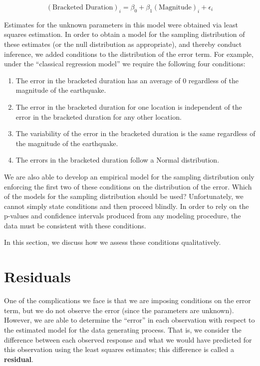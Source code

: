 \documentclass[]{book}
\providecommand{\tightlist}{%
  \setlength{\itemsep}{0pt}\setlength{\parskip}{0pt}}
\theoremstyle{plain}
\theoremstyle{mydefn}
\theoremstyle{myexmpl}
\theoremstyle{remark}
\begin{document}
\[(\text{Bracketed Duration})_i = \beta_0 + \beta_1(\text{Magnitude})_i + \epsilon_i\]

Estimates for the unknown parameters in this model were obtained via
least squares estimation. In order to obtain a model for the sampling
distribution of these estimates (or the null distribution as
appropriate), and thereby conduct inference, we added conditions to the
distribution of the error term. For example, under the ``classical
regression model'' we require the following four conditions:

\begin{enumerate}
\def\labelenumi{\arabic{enumi}.}
\tightlist
\item
  The error in the bracketed duration has an average of 0 regardless of
  the magnitude of the earthquake.
\item
  The error in the bracketed duration for one location is independent of
  the error in the bracketed duration for any other location.
\item
  The variability of the error in the bracketed duration is the same
  regardless of the magnitude of the earthquake.
\item
  The errors in the bracketed duration follow a Normal distribution.
\end{enumerate}

We are also able to develop an empirical model for the sampling
distribution only enforcing the first two of these conditions on the
distribution of the error. Which of the models for the sampling
distribution should be used? Unfortunately, we cannot simply state
conditions and then proceed blindly. In order to rely on the p-values
and confidence intervals produced from any modeling procedure, the data
must be consistent with these conditions.

In this section, we discuss how we assess these conditions
qualitatively.

\section{Residuals}\label{residuals}

One of the complications we face is that we are imposing conditions on
the error term, but we do not observe the error (since the parameters
are unknown). However, we are able to determine the ``error'' in each
observation with respect to the estimated model for the data generating
process. That is, we consider the difference between each observed
response and what we would have predicted for this observation using the
least squares estimates; this difference is called a \textbf{residual}.
\end{document}
